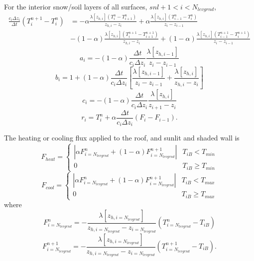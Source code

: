 \documentclass[12pt,authoryear]{elsarticle}
\numberwithin{equation}{section} %
\begin{document}
For the interior snow/soil layers of all surfaces, $snl+1<i<N_{levgrnd}$, 
\begin{equation}
\begin{aligned}
\frac{c_{i}\Delta z_{i}}{\Delta t}(T_{i}^{n+1} -T_{i}^{n})
&=-\alpha\frac{\lambda[z_{h,i}](T_{i}^{n}-T_{i+1}^{n})}{z_{h,i}-z_{i}}+\alpha\frac{\lambda[z_{h,i}](T_{i-1}^{n}-T_{i}^{n})}{z_{i}-z_{i-1}}\\
&-(1-\alpha)\frac{\lambda[z_{h,i}](T_{i}^{n+1}-T_{i+1}^{n+1})}{z_{h,i}-z_{i}}+(1-\alpha)\frac{\lambda[z_{h,i}](T_{i-1}^{n+1}-T_{i}^{n+1})}{z_{i}-z_{i-1}}
\end{aligned}
\end{equation}
\begin{equation}
a_{i} = -(1-\alpha)\frac{\Delta t}{c_{i}\Delta z_{i}}\frac{\lambda [z_{h,i-1}]}{z_{i}-z_{i-1}}
\end{equation}
\begin{equation}
b_{i} = 1+(1-\alpha)\frac{\Delta t}{c_{i} \Delta z_{i}}\left[\frac{\lambda [z_{h,i-1}]}{z_{i}-z_{i-1}}+\frac{\lambda [z_{h,i}]}{z_{h,i}-z_{i}}\right]
\end{equation}
\begin{equation}
c_{i}=-(1-\alpha)\frac{\Delta t}{c_{i}\Delta z_{i}}\frac{\lambda[z_{h,i}]}{z_{i+1}-z_{i}}
\end{equation}
\begin{equation}
r_{i}=T_{i}^{n}+\alpha\frac{\Delta t}{c_{i}\Delta z_{i}}(F_{i}- F_{i-1}).
\end{equation}

The heating or cooling flux applied to the roof, and sunlit and shaded wall is
\begin{equation}
F_{heat} = 
\begin{cases}
|\alpha F_{i=N_{levgrnd}}^n+(1-\alpha)F_{i=N_{levgrnd}}^{n+1}| & T_{iB} < T_{min} \\
0 & T_{iB} \geq T_{min}
\end{cases}
\end{equation}
\begin{equation}
F_{cool} = 
\begin{cases}
|\alpha F_{i=N_{levgrnd}}^n+(1-\alpha)F_{i=N_{levgrnd}}^{n+1}| & T_{iB} < T_{max} \\
0 & T_{iB} \geq T_{max}
\end{cases}
\end{equation}
where
\begin{equation}
F_{i=N_{levgrnd}}^{n} = -\frac{\lambda[z_{h,i=N_{levgrnd}}]}{z_{h,i=N_{levgrnd}}-z_{i=N_{levgrnd}}}(T_{i=N_{levgrnd}}^{n}-T_{iB})
\end{equation}
\begin{equation}
\label{eq:flux_i_n+1}
F_{i=N_{levgrnd}}^{n+1} = -\frac{\lambda[z_{h,i=N_{levgrnd}}]}{z_{h,i=N_{levgrnd}}-z_{i=N_{levgrnd}}}(T_{i=N_{levgrnd}}^{n+1}-T_{iB}).
\end{equation}
\end{document}

